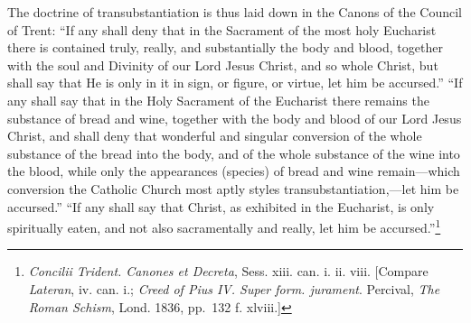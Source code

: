 \documentclass[english,]{book}
\begin{document}
The doctrine of transubstantiation is thus laid down in the Canons of the Council of Trent: ``If any shall deny that in the Sacrament of the most holy Eucharist there is contained truly, really, and substantially the body and blood, together with the soul and Divinity of our Lord Jesus Christ, and so whole Christ, but shall say that He is only in it in sign, or figure, or virtue, let him be accursed.'' ``If any shall say that in the Holy Sacrament of the Eucharist there remains the substance of bread and wine, together with the body and blood of our Lord Jesus Christ, and shall deny that wonderful and singular conversion of the whole substance of the bread into the body, and of the whole substance of the wine into the blood, while only the appearances (species) of bread and wine remain---which conversion the Catholic Church most aptly styles transubstantiation,---let him be accursed.'' ``If any shall say that Christ, as exhibited in the Eucharist, is only spiritually eaten, and not also sacramentally and really, let him be accursed.''\footnote{\emph{Concilii Trident. Canones et Decreta}, Sess. xiii. can. i. ii. viii. {[}Compare \emph{Lateran}, iv. can. i.; \emph{Creed of Pius IV. Super form. jurament}. Percival, \emph{The Roman Schism}, Lond. 1836, pp.~132 f. xlviii.{]}}
\end{document}
